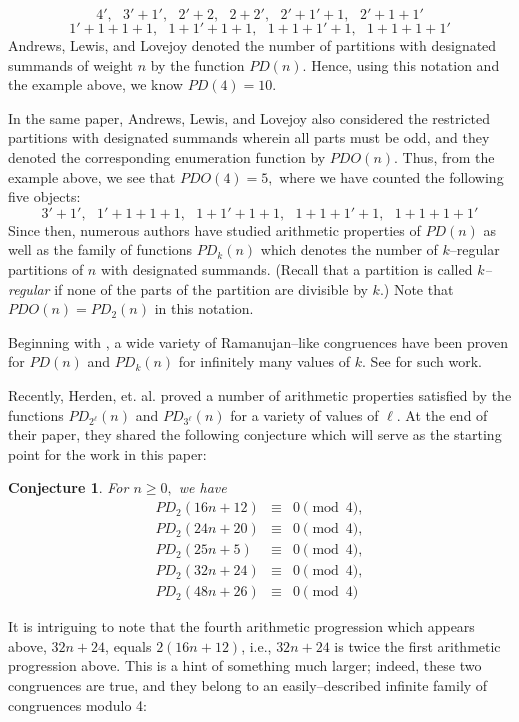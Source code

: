 \documentclass{amsart}
\newtheorem{conjecture}[theorem]{Conjecture}
\begin{document}
$$
4',\ \ \  3'+1',\ \ \  2'+2,\ \ \  2+2',\ \ \  2'+1'+1,\ \ \  2'+1+1'
$$
$$
1'+1+1+1,\ \ \  1+1'+1+1,\ \ \  1+1+1'+1,\ \ \  1+1+1+1'
$$
Andrews, Lewis, and Lovejoy denoted the number of partitions with designated summands of weight $n$ by the function $PD(n).$  Hence, using this notation and the example above, we know $PD(4)=10.$

In the same paper, Andrews, Lewis, and Lovejoy \cite{ALL} also considered the restricted partitions with designated summands wherein all parts must be odd, and they denoted the corresponding enumeration function by $PDO(n).$  Thus, from the example above, we see that $PDO(4)=5,$ where we have counted the following five objects:  
$$
3'+1',\ \ \  1'+1+1+1,\ \ \  1+1'+1+1,\ \ \  1+1+1'+1,\ \ \  1+1+1+1'
$$
Since then, numerous authors have studied arithmetic properties of $PD(n)$ as well as the family of functions $PD_k(n)$ which denotes the number of $k$--regular partitions of $n$ with designated summands.  (Recall that a partition is called {\it $k$--regular} if none of the parts of the partition are divisible by $k.$)  Note that $PDO(n) = PD_2(n)$ in this notation. 

Beginning with \cite{ALL}, a wide variety of Ramanujan--like congruences have been proven for $PD(n)$ and $PD_k(n)$ for infinitely many values of $k$.  See \cite{BK, BO, CJJS, dSS3, dSSk, HBN, NG, Xia} for such work.  

Recently, Herden, et. al. \cite{Her} proved a number of arithmetic properties satisfied by the functions $PD_{2^\ell}(n)$ and $PD_{3^\ell}(n)$ for a variety of values of $\ell$.  At the end of their paper, they shared the following conjecture which will serve as the starting point for the work in this paper:  


    \begin{conjecture}
    \label{Herden_conjectures}
        For $n\geq 0,$ we have 
        \begin{eqnarray*}
        PD_2(16n+12) &\equiv & 0 \pmod{4}, \\
        PD_2(24n+20) &\equiv & 0 \pmod{4}, \\
        PD_2(25n+5) &\equiv & 0 \pmod{4}, \\
        PD_2(32n+24) &\equiv & 0 \pmod{4}, \\
        PD_2(48n+26) &\equiv & 0 \pmod{4}          
        \end{eqnarray*}
    \end{conjecture}
It is intriguing to note that the fourth arithmetic progression which appears above, $32n+24$, equals $2(16n+12)$, i.e., $32n+24$ is twice the first arithmetic progression above.  This is a hint of something much larger; indeed, these two congruences are true, and they belong to an easily--described infinite family of congruences modulo 4:  
\end{document}
